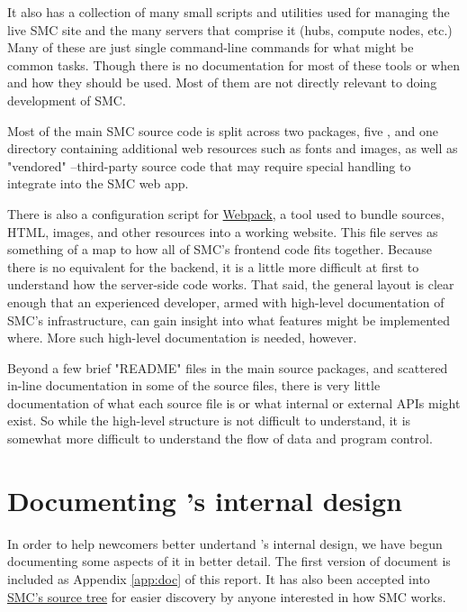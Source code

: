 \documentclass{deliverablereport}
\begin{document}
It also has a collection of many small scripts and utilities used for managing
the live SMC site and the many servers that comprise it (hubs, compute nodes,
etc.)  Many of these are just single command-line commands for what might be
common tasks.  Though there is no documentation for most of these tools or when
and how they should be used.  Most of them are not directly relevant to
doing development of SMC.

Most of the main SMC source code is split across two \Python packages, five
\JavaScript, and one directory containing additional web resources such as
fonts and images, as well as "vendored" \JavaScript--third-party source code
that may require special handling to integrate into the SMC web app.

There is also a configuration script for \href{https://webpack.github.io/}{Webpack},
a tool used to bundle \JavaScript sources, HTML, images, and other resources
into a working website.  This file serves as something of a map to how all of
SMC's frontend code fits together.  Because there is no equivalent for the
backend, it is a little more difficult at first to understand how the
server-side code works.  That said, the general layout is clear enough that an
experienced developer, armed with high-level documentation of SMC's
infrastructure, can gain insight into what features might be implemented where.
More such high-level documentation is needed, however.

Beyond a few brief "README" files in the main source packages, and scattered
in-line documentation in some of the source files, there is very little
documentation of what each source file is or what internal or external APIs
might exist.  So while the high-level structure is not difficult to understand,
it is somewhat more difficult to understand the flow of data and program
control.

\section{Documenting \SMC's internal design}

In order to help newcomers better undertand \SMC's internal design, we have
begun documenting some aspects of it in better detail.  The first version of
document is included as Appendix \ref{app:doc} of this report. It has also been accepted
into \href{https://github.com/sagemathinc/smc/blob/master/src/doc/design_overview/overview.rst}{SMC's source tree} for easier discovery by anyone interested in how SMC
works.
\end{document}
